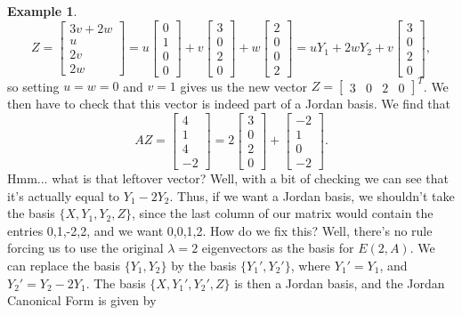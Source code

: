 \documentclass[12pt,letterpaper]{article}
\theoremstyle{definition}
\newtheorem{example}{Example}
\begin{document}
\begin{example}
\[
 Z = \begin{bmatrix}3v+2w\\u\\2v\\2w\end{bmatrix}=u\begin{bmatrix}0\\1\\0\\0\end{bmatrix} +v\begin{bmatrix}3\\0\\2\\0\end{bmatrix}+w\begin{bmatrix}2\\0\\0\\2\end{bmatrix}=uY_1+2wY_2+v\begin{bmatrix}3\\0\\2\\0\end{bmatrix},
\]
so setting $u=w=0$ and $v=1$ gives us the new vector $Z=\begin{bmatrix}3&0&2&0\end{bmatrix}^T$. We then have to check that this vector is indeed part of a Jordan basis. We find that
\[
 AZ = \begin{bmatrix}4\\1\\4\\-2\end{bmatrix} = 2\begin{bmatrix}3\\0\\2\\0\end{bmatrix}+\begin{bmatrix}-2\\1\\0\\-2\end{bmatrix}.
\]
Hmm... what is that leftover vector? Well, with a bit of checking we can see that it's actually equal to $Y_1-2Y_2$. Thus, if we want a Jordan basis, we shouldn't take the basis $\{X,Y_1,Y_2,Z\}$, since the last column of our matrix would contain the entries 0,1,-2,2, and we want 0,0,1,2. How do we fix this? Well, there's no rule forcing us to use the original $\lambda=2$ eigenvectors as the basis for $E(2,A)$. We can replace the basis $\{Y_1,Y_2\}$ by the basis $\{Y_1',Y_2'\}$, where $Y_1'=Y_1$, and $Y_2'=Y_2-2Y_1$. The basis $\{X,Y_1',Y_2',Z\}$ is then a Jordan basis, and the Jordan Canonical Form is given by

\end{example}
\end{document}
